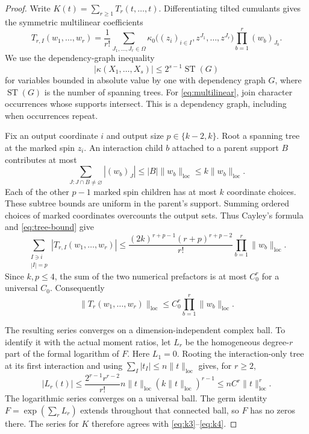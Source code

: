 \documentclass[11pt]{article}
\newcommand{\loc}{\mathrm{loc}}
\DeclareMathOperator{\ST}{ST}
\begin{document}
\begin{proof}
Write \(K(t)=\sum_{r\ge1}T_r(t,\ldots,t)\).
Differentiating tilted cumulants gives the symmetric multilinear coefficients
\begin{equation}\label{eq:multilinear}
T_{r,I}(w_1,\ldots,w_r)
=\frac1{r!}\sum_{J_1,\ldots,J_r\in\Omega}
\kappa_0\big((z_i)_{i\in I},z^{J_1},\ldots,z^{J_r}\big)
\prod_{b=1}^r(w_b)_{J_b}.
\end{equation}
We use the dependency-graph inequality~\cite[Eq.~(47)]{FMN2015}
\begin{equation}\label{eq:tree-bound}
|\kappa(X_1,\ldots,X_s)|\le2^{s-1}\ST(G)
\end{equation}
for variables bounded in absolute value by one with dependency graph \(G\), where \(\ST(G)\) is the number of spanning trees.
For \eqref{eq:multilinear}, join character occurrences whose supports intersect.
This is a dependency graph, including when occurrences repeat.

Fix an output coordinate \(i\) and output size \(p\in\{k-2,k\}\).
Root a spanning tree at the marked spin \(z_i\).
An interaction child \(b\) attached to a parent support \(B\) contributes at most
\[
\sum_{J:J\cap B\ne\varnothing}|(w_b)_J|
\le |B|\|w_b\|_{\loc}\le k\|w_b\|_{\loc}.
\]
Each of the other \(p-1\) marked spin children has at most \(k\) coordinate choices.
These subtree bounds are uniform in the parent's support.
Summing ordered choices of marked coordinates overcounts the output sets.
Thus Cayley's formula and \eqref{eq:tree-bound} give
\begin{equation}\label{eq:anchored-tree}
\sum_{\substack{I\ni i\\|I|=p}}
|T_{r,I}(w_1,\ldots,w_r)|
\le
\frac{(2k)^{r+p-1}(r+p)^{r+p-2}}{r!}
\prod_{b=1}^r\|w_b\|_{\loc}.
\end{equation}
Since \(k,p\le4\), the sum of the two numerical prefactors is at most \(C_0^r\) for a universal \(C_0\).
Consequently
\begin{equation}\label{eq:mixed-bound}
\|T_r(w_1,\ldots,w_r)\|_{\loc}
\le C_0^r\prod_{b=1}^r\|w_b\|_{\loc}.
\end{equation}

The resulting series converges on a dimension-independent complex ball.
To identify it with the actual moment ratios, let \(L_r\) be the homogeneous degree-\(r\) part of the formal logarithm of \(F\).
Here \(L_1=0\).
Rooting the interaction-only tree at its first interaction and using
\(\sum_I|t_I|\le n\|t\|_{\loc}\) gives, for \(r\ge2\),
\begin{equation}\label{eq:log-bound}
|L_r(t)|
\le
\frac{2^{r-1}r^{r-2}}{r!}
n\|t\|_{\loc}(k\|t\|_{\loc})^{r-1}
\le nC^r\|t\|_{\loc}^r.
\end{equation}
The logarithmic series converges on a universal ball.
The germ identity \(F=\exp(\sum_rL_r)\) extends throughout that connected ball, so \(F\) has no zeros there.
The series for \(K\) therefore agrees with \eqref{eq:k3}--\eqref{eq:k4}.


\end{proof}
\end{document}
